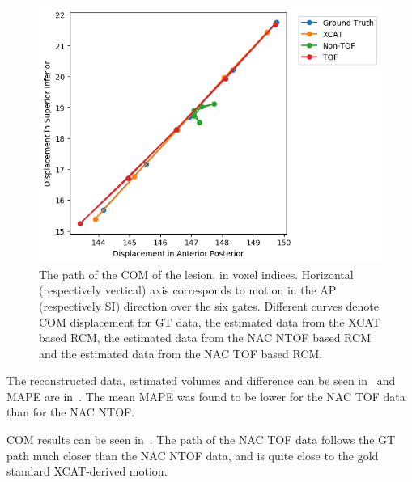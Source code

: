            \begin{figure}
                \centering
                
                \includegraphics[width=1.0\linewidth]{figures/motion_correction_1_results_1_TOF.png}
                
                \captionsetup{singlelinecheck=false, justification=raggedright}
                \caption{The path of the \gls{COM} of the lesion, in voxel indices. Horizontal (respectively vertical) axis corresponds to motion in the \gls{AP} (respectively \gls{SI}) direction over the six gates. Different curves denote \gls{COM} displacement for \gls{GT} data, the estimated data from the \gls{XCAT} based \gls{RCM}, the estimated data from the \gls{NAC} \gls{NTOF} based \gls{RCM} and the estimated data from the \gls{NAC} \gls{TOF} based \gls{RCM}.} \label{fig:impact_of_tof_on_respiratory_motion_model_estimation_using_pre_gated_no_intra_cycle_motion_nac_pet_results_com_graph}
            \end{figure}
            
             The reconstructed data, estimated volumes and difference can be seen in~ and \gls{MAPE} are in~. The mean \gls{MAPE} was found to be lower for the \gls{NAC} \gls{TOF} data than for the \gls{NAC} \gls{NTOF}.
            
             \gls{COM} results can be seen in~. The path of the \gls{NAC} \gls{TOF} data follows the \gls{GT} path much closer than the \gls{NAC} \gls{NTOF} data, and is quite close to the gold standard \gls{XCAT}-derived motion.
            
